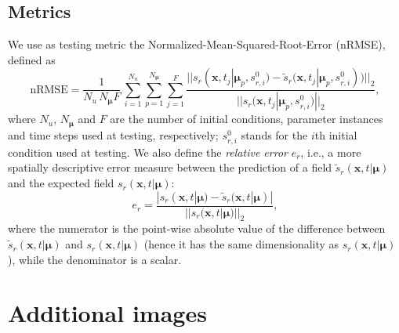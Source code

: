 \subsection{Metrics}
 We use as testing metric the Normalized-Mean-Squared-Root-Error (nRMSE), defined as
\begin{equation}
\label{eq:nRMSE}
    \text{nRMSE} =\frac{1}{N_u\,N_{\pmb{\mu}}F}\,\sum_{i=1}^{N_u}\sum_{p=1}^{N_{\pmb{\mu}}}\sum_{j=1}^F \frac{||s_r(\mathbf{x},t_j|\pmb{\mu}_p,s_{r,i}^0)-\tilde{s}_r(\mathbf{x},t_j|\pmb{\mu}_p,s_{r,i}^0))||_2}{||s_r(\mathbf{x},t_j|\pmb{\mu}_p,s_{r,i}^0)||_2},
\end{equation}
where $N_u$, $N_{\pmb{\mu}}$ and $F$ are the number of initial conditions, parameter instances and time steps used at testing, respectively; $s^0_{r,i}$ stands for the $i$th initial condition used at testing. We also define the \textit{relative error} $e_r$, i.e., a more spatially descriptive error measure between the prediction of a field $\tilde{s}_r(\mathbf{x},t|\pmb{\mu})$ and the expected field $s_r(\mathbf{x},t|\pmb{\mu})$:
\begin{equation}
\label{eq:relative_error}
    e_r = \frac{|s_r(\mathbf{x},t|\pmb{\mu})-\tilde{s}_r(\mathbf{x},t|\pmb{\mu})|}{||s_r(\mathbf{x},t|\pmb{\mu})||_2},
\end{equation}
where the numerator is the point-wise absolute value of the difference between $\tilde{s}_r(\mathbf{x},t|\pmb{\mu})$ and $s_r(\mathbf{x},t|\pmb{\mu})$ (hence it has the same dimensionality as $s_r(\mathbf{x},t|\pmb{\mu})$), while the denominator is a scalar.
\section{Additional images}

